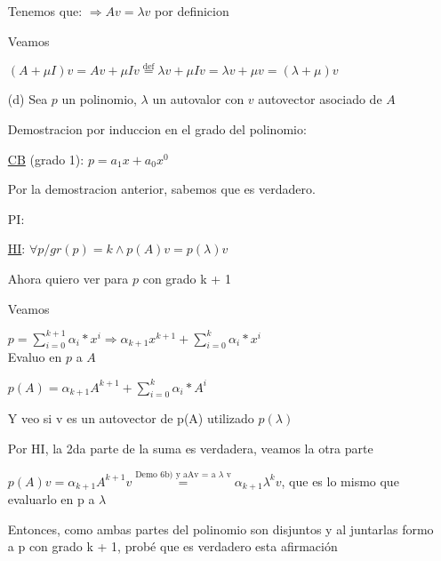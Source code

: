 \begin{itemize}
    Tenemos que: $\Rightarrow Av = \lambda v$ por definicion
    
    Veamos
    
    $(A + \mu I)v = Av + \mu I v \overset{\text{def}}{=} \lambda v + \mu Iv = \lambda v + \mu v = (\lambda + \mu) v $


    \item [(d)]
    Sea $p$ un polinomio, $\lambda$ un autovalor con $v$ autovector asociado de $A$

    Demostracion por induccion en el grado del polinomio:

    \underline{CB} (grado 1):
        $p = a_{1} x + a_{0} x^{0} $

    Por la demostracion anterior, sabemos que es verdadero.

    PI:

    \underline{HI}: {$\forall p / gr(p) = k \land p(A) v = p(\lambda) v$} 

    Ahora quiero ver para $p$ con grado k + 1

    Veamos

    $p = \sum_{i = 0}^{k + 1} \alpha_{i} * x^{i} \Rightarrow \alpha_{k+1} x^{k+1} + \sum_{i = 0}^{k} \alpha_{i} * x^{i} $ \\
    
    Evaluo en $p$ a $A$

    $p(A) = \alpha_{k+1} A^{k+1} + \sum_{i = 0}^{k} \alpha_{i} * A^{i}$

    Y veo si v es un autovector de p(A) utilizado $p(\lambda)$

    Por HI, la 2da parte de la suma es verdadera, veamos la otra parte

    $p(A) v= \alpha_{k+1} A^{k+1}v \overset{\text{Demo 6b) y aAv = a $\lambda$ v}}{=} \alpha_{k+1} \lambda^{k} v$, que es lo mismo que evaluarlo en p a $\lambda$

    Entonces, como ambas partes del polinomio son disjuntos y al juntarlas formo a p con grado k + 1, probé que es verdadero esta afirmación
\end{itemize}